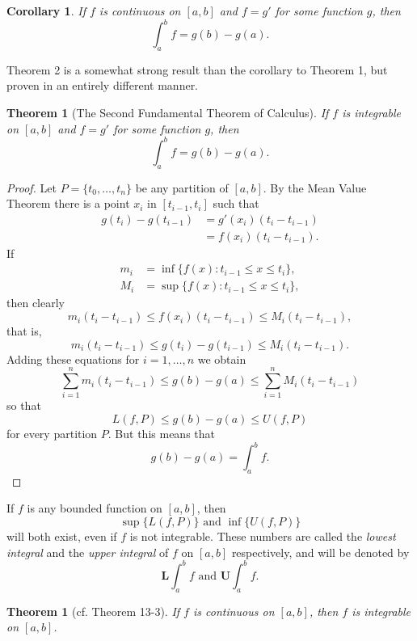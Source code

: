 \documentclass{article}
\newtheorem{corollary}{Corollary}
\numberwithin{corollary}{subsection}
\numberwithin{definition}{subsection}
\numberwithin{lemma}{subsection}
\newtheorem{theorem}{Theorem}
\numberwithin{theorem}{subsection}
\newtheorem*{theorem*}{Theorem}
\begin{document}
\begin{corollary}
  If $f$ is continuous on $[a, b]$ and $f = g'$ for some function $g$, then \[
    \int_a^b f = g(b) - g(a).
  \]
\end{corollary}

Theorem 2 is a somewhat strong result than the corollary to Theorem 1, but
proven in an entirely different manner.

\begin{theorem}[The Second Fundamental Theorem of Calculus]
  If $f$ is integrable on $[a, b]$ and $f = g'$ for some function $g$, then \[
    \int_a^b f = g(b) - g(a).
  \]
\end{theorem}
\begin{proof}
  Let $P = \{t_0, \ldots, t_n\}$ be any partition of $[a, b]$. By the Mean
  Value Theorem there is a point $x_i$ in $[t_{i-1}, t_i]$ such that
  \begin{align*}
    g(t_i) - g(t_{i-1})
    &= g'(x_i)(t_i - t_{i-1}) \\
    &= f(x_i)(t_i - t_{i-1}).
  \end{align*}
  If
  \begin{align*}
    m_i &= \inf\{f(x): t_{i-1} \leq x \leq t_i\}, \\
    M_i &= \sup\{f(x): t_{i-1} \leq x \leq t_i\},
  \end{align*}
  then clearly \[
    m_i(t_i - t_{i-1}) \leq f(x_i)(t_i - t_{i-1}) \leq M_i(t_i - t_{i-1}),
  \] that is, \[
    m_i(t_i - t_{i-1}) \leq g(t_i) - g(t_{i-1}) \leq M_i(t_i - t_{i-1}).
  \] Adding these equations for $i = 1, \ldots, n$ we obtain \[
    \sum_{i=1}^n m_i(t_i - t_{i-1})
    \leq g(b) - g(a)
    \leq \sum_{i=1}^n M_i(t_i - t_{i-1})
  \] so that \[
    L(f, P) \leq g(b) - g(a) \leq U(f, P)
  \] for every partition $P$. But this means that \[
    g(b) - g(a) = \int_a^b f.
  \]
\end{proof}

If $f$ is any bounded function on $[a, b]$, then \[
  \sup\{L(f, P)\} \text{ and } \inf\{U(f, P)\}
\] will both exist, even if $f$ is not integrable. These numbers
are called the \emph{lowest integral} and the \emph{upper integral} of $f$ on
$[a, b]$ respectively, and will be denoted by \[
  \textbf{L}\int_a^b f \text{ and } \textbf{U}\int_a^b f.
\]

\begin{theorem*}[cf. Theorem 13-3]
  If $f$ is continuous on $[a, b]$, then $f$ is integrable on $[a, b]$.
\end{theorem*}
\end{document}
